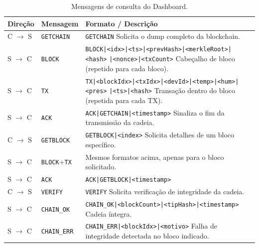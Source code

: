 \documentclass[12pt, a4paper]{article}
\begin{document}
\begin{table}[H]
\centering
\caption{Mensagens de consulta do Dashboard.}
\label{tab:dash-query}
\begin{tabularx}{\linewidth}{llX}
\toprule
\textbf{Direção} & \textbf{Mensagem} & \textbf{Formato / Descrição} \\
\midrule
C $\to$ S & \texttt{GETCHAIN}  & \texttt{GETCHAIN} \newline Solicita o dump completo da blockchain. \\
\addlinespace
S $\to$ C & \texttt{BLOCK}     & \texttt{BLOCK|<idx>|<ts>|<prevHash>|<merkleRoot>|<hash>} \newline \texttt{|<nonce>|<txCount>} \newline Cabeçalho de bloco (repetido para cada bloco). \\
\addlinespace
S $\to$ C & \texttt{TX}        & \texttt{TX|<blockIdx>|<txIdx>|<devId>|<temp>|<hum>|<pres>} \newline \texttt{|<ts>|<hash>} \newline Transação dentro do bloco (repetida para cada TX). \\
\addlinespace
S $\to$ C & \texttt{ACK}       & \texttt{ACK|GETCHAIN|<timestamp>} \newline Sinaliza o fim da transmissão da cadeia. \\
\midrule
C $\to$ S & \texttt{GETBLOCK}  & \texttt{GETBLOCK|<index>} \newline Solicita detalhes de um bloco específico. \\
\addlinespace
S $\to$ C & \texttt{BLOCK}+\texttt{TX} & Mesmos formatos acima, apenas para o bloco solicitado. \\
\addlinespace
S $\to$ C & \texttt{ACK}       & \texttt{ACK|GETBLOCK|<timestamp>} \\
\midrule
C $\to$ S & \texttt{VERIFY}    & \texttt{VERIFY} \newline Solicita verificação de integridade da cadeia. \\
\addlinespace
S $\to$ C & \texttt{CHAIN\_OK} & \texttt{CHAIN\_OK|<blockCount>|<tipHash>|<timestamp>} \newline Cadeia íntegra. \\
\addlinespace
S $\to$ C & \texttt{CHAIN\_ERR}& \texttt{CHAIN\_ERR|<blockIdx>|<motivo>} \newline Falha de integridade detectada no bloco indicado. \\
\bottomrule
\end{tabularx}
\end{table}
\end{document}

